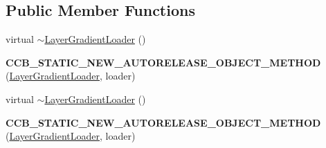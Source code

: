 \subsection*{Public Member Functions}
\begin{DoxyCompactItemize}
\item 
virtual \hyperlink{classcocosbuilder_1_1LayerGradientLoader_aa8e020a5c3f0e6f06df6e971b1a1a24c}{$\sim$\+Layer\+Gradient\+Loader} ()
\item 
\mbox{\label{classcocosbuilder_1_1LayerGradientLoader_a7e7ae2441c7ce98f6ccec797d67b345b}} 
{\bfseries C\+C\+B\+\_\+\+S\+T\+A\+T\+I\+C\+\_\+\+N\+E\+W\+\_\+\+A\+U\+T\+O\+R\+E\+L\+E\+A\+S\+E\+\_\+\+O\+B\+J\+E\+C\+T\+\_\+\+M\+E\+T\+H\+OD} (\hyperlink{classcocosbuilder_1_1LayerGradientLoader}{Layer\+Gradient\+Loader}, loader)
\item 
virtual \hyperlink{classcocosbuilder_1_1LayerGradientLoader_aa8e020a5c3f0e6f06df6e971b1a1a24c}{$\sim$\+Layer\+Gradient\+Loader} ()
\item 
\mbox{\label{classcocosbuilder_1_1LayerGradientLoader_a7e7ae2441c7ce98f6ccec797d67b345b}} 
{\bfseries C\+C\+B\+\_\+\+S\+T\+A\+T\+I\+C\+\_\+\+N\+E\+W\+\_\+\+A\+U\+T\+O\+R\+E\+L\+E\+A\+S\+E\+\_\+\+O\+B\+J\+E\+C\+T\+\_\+\+M\+E\+T\+H\+OD} (\hyperlink{classcocosbuilder_1_1LayerGradientLoader}{Layer\+Gradient\+Loader}, loader)
\end{DoxyCompactItemize}
